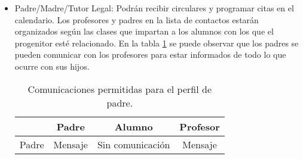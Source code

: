 \begin{itemize}
			\item Padre/Madre/Tutor Legal: Podrán recibir circulares y programar citas en el calendario. Los profesores y padres en la lista de contactos estarán organizados según las clases que impartan a los alumnos con los que el progenitor esté relacionado.
			En la tabla \ref{table:fathersCommunications} se puede observar que los padres se pueden comunicar con los profesores para estar informados de todo lo que ocurre con sus hijos.
			
			\begin{table} [!hbt]
				\begin{center}
					\begin{tabular}{|| c | c | c | c ||}
						\hline
						\hline
						& Padre & Alumno & Profesor \\
						\hline
						Padre & Mensaje & Sin comunicación & Mensaje \\
						\hline
						\hline
					\end{tabular}
					\caption{Comunicaciones permitidas para el perfil de padre.}
					\label{table:fathersCommunications}
				\end{center}
			\end{table}
			
			
		\end{itemize}
